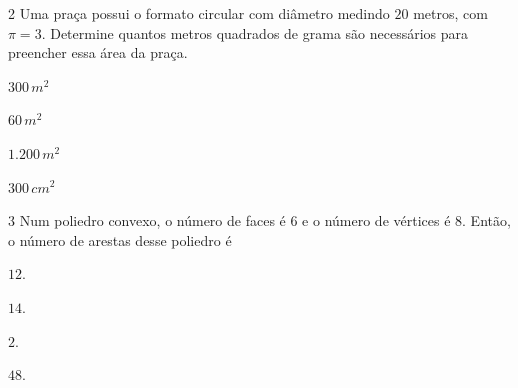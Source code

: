 {{{{\num{2}  Uma praça possui o formato circular com diâmetro medindo $20$ metros,
com $\pi = 3$.
Determine quantos metros quadrados de grama são necessários para preencher
essa área da praça.

\begin{multicols}{2}
\begin{escolha}
\item $300\,m^2$
\item $60\,m^2$
\item $1.200\,m^2$
\item $300\,cm^2$
\end{escolha}
\end{multicols}



\num{3}  Num poliedro convexo, o número de faces é $6$ e o número de vértices é
$8$. Então, o número de arestas desse poliedro é

\begin{escolha}
\item $12$.

\item $14$.

\item $2$.

\item $48$.
\end{escolha}


}}}}
